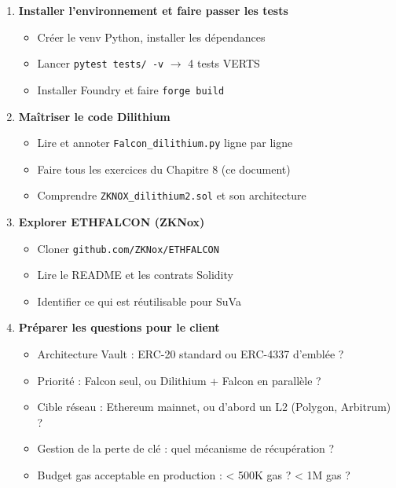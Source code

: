 \documentclass[12pt, a4paper]{article}
\begin{document}
\begin{tcolorbox}[colback=suva_blue!5, colframe=suva_blue, title=\textbf{Prochaines actions concrètes (semaines 1--2)}]
\begin{enumerate}[leftmargin=*]
  \item[\textbf{J1}] \textbf{Installer l'environnement et faire passer les tests}
    \begin{itemize}
      \item Créer le venv Python, installer les dépendances
      \item Lancer \texttt{pytest tests/ -v} $\to$ 4 tests VERTS
      \item Installer Foundry et faire \texttt{forge build}
    \end{itemize}

  \item[\textbf{J2--J3}] \textbf{Maîtriser le code Dilithium}
    \begin{itemize}
      \item Lire et annoter \texttt{Falcon\_dilithium.py} ligne par ligne
      \item Faire tous les exercices du Chapitre 8 (ce document)
      \item Comprendre \texttt{ZKNOX\_dilithium2.sol} et son architecture
    \end{itemize}

  \item[\textbf{J4--J5}] \textbf{Explorer ETHFALCON (ZKNox)}
    \begin{itemize}
      \item Cloner \texttt{github.com/ZKNox/ETHFALCON}
      \item Lire le README et les contrats Solidity
      \item Identifier ce qui est réutilisable pour SuVa
    \end{itemize}

  \item[\textbf{Semaine 2}] \textbf{Préparer les questions pour le client}
    \begin{itemize}
      \item Architecture Vault : ERC-20 standard ou ERC-4337 d'emblée ?
      \item Priorité : Falcon seul, ou Dilithium + Falcon en parallèle ?
      \item Cible réseau : Ethereum mainnet, ou d'abord un L2 (Polygon, Arbitrum) ?
      \item Gestion de la perte de clé : quel mécanisme de récupération ?
      \item Budget gas acceptable en production : < 500K gas ? < 1M gas ?
    \end{itemize}
\end{enumerate}
\end{tcolorbox}
\end{document}
